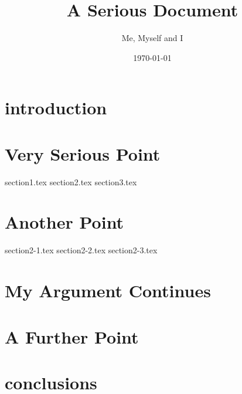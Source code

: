 \documentclass[a4paper]{report}
\title{A Serious Document}
\author{Me, Myself and I}
\date{\today}
\begin{document}
\maketitle

\tableofcontents
\pagebreak

\begin{abstract}

\end{abstract}

\chapter{introduction}


\chapter{Very Serious Point}
{section1.tex}
{section2.tex}
{section3.tex}

\chapter{Another Point}
{section2-1.tex}
{section2-2.tex}
{section2-3.tex}

\chapter{My Argument Continues}


\chapter{A Further Point}


\chapter{conclusions}

\appendix
\end{document}
